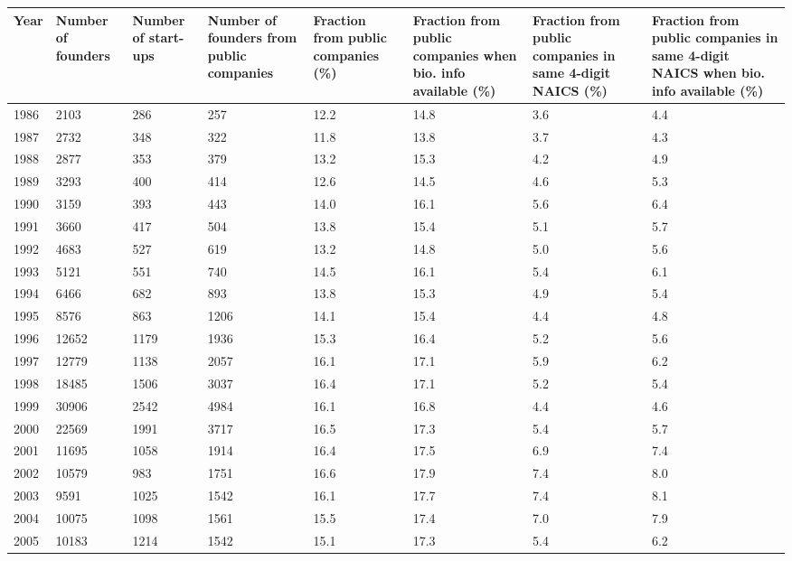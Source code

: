 \begin{table}[!htb]
\centering
\begingroup\scriptsize
\begin{tabular}{p{1.75cm}p{1.75cm}p{1.75cm}p{1.75cm}p{1.75cm}p{1.75cm}p{1.75cm}p{1.75cm}}
  \toprule
Year & Number of founders & Number of start-ups & Number of founders from public companies & Fraction from public companies (\%) & Fraction from public companies when bio. info available (\%) & Fraction from public companies in same 4-digit NAICS (\%) & Fraction from public companies in same 4-digit NAICS when bio. info available (\%) \\ 
  \midrule
1986 & 2103 & 286 & 257 & 12.2 & 14.8 & 3.6 & 4.4 \\ 
  1987 & 2732 & 348 & 322 & 11.8 & 13.8 & 3.7 & 4.3 \\ 
  1988 & 2877 & 353 & 379 & 13.2 & 15.3 & 4.2 & 4.9 \\ 
  1989 & 3293 & 400 & 414 & 12.6 & 14.5 & 4.6 & 5.3 \\ 
  1990 & 3159 & 393 & 443 & 14.0 & 16.1 & 5.6 & 6.4 \\ 
  1991 & 3660 & 417 & 504 & 13.8 & 15.4 & 5.1 & 5.7 \\ 
  1992 & 4683 & 527 & 619 & 13.2 & 14.8 & 5.0 & 5.6 \\ 
  1993 & 5121 & 551 & 740 & 14.5 & 16.1 & 5.4 & 6.1 \\ 
  1994 & 6466 & 682 & 893 & 13.8 & 15.3 & 4.9 & 5.4 \\ 
  1995 & 8576 & 863 & 1206 & 14.1 & 15.4 & 4.4 & 4.8 \\ 
  1996 & 12652 & 1179 & 1936 & 15.3 & 16.4 & 5.2 & 5.6 \\ 
  1997 & 12779 & 1138 & 2057 & 16.1 & 17.1 & 5.9 & 6.2 \\ 
  1998 & 18485 & 1506 & 3037 & 16.4 & 17.1 & 5.2 & 5.4 \\ 
  1999 & 30906 & 2542 & 4984 & 16.1 & 16.8 & 4.4 & 4.6 \\ 
  2000 & 22569 & 1991 & 3717 & 16.5 & 17.3 & 5.4 & 5.7 \\ 
  2001 & 11695 & 1058 & 1914 & 16.4 & 17.5 & 6.9 & 7.4 \\ 
  2002 & 10579 & 983 & 1751 & 16.6 & 17.9 & 7.4 & 8.0 \\ 
  2003 & 9591 & 1025 & 1542 & 16.1 & 17.7 & 7.4 & 8.1 \\ 
  2004 & 10075 & 1098 & 1561 & 15.5 & 17.4 & 7.0 & 7.9 \\ 
  2005 & 10183 & 1214 & 1542 & 15.1 & 17.3 & 5.4 & 6.2 \\ 

\end{tabular}
\end{table}
